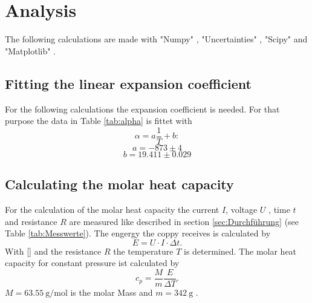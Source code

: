 \section{Analysis}
\label{sec:Auswertung}
The following calculations are made with  "Numpy" \cite{numpy}, 
"Uncertainties" \cite{uncertainties}, 
"Scipy" \cite{scipy} and  "Matplotlib" \cite{matplotlib}.

\subsection{Fitting the linear expansion coefficient}
For the following calculations the expansion coefficient is needed.
For that purpose the data in Table \ref{tab:alpha}
is fittet with
\begin{equation*}
    \alpha = a \frac{1}{T} + b:
\end{equation*}
\begin{equation*}
    a = -873 \pm 4
\end{equation*}
\begin{equation*}
    b= 19.411 \pm 0.029
\end{equation*}


\subsection{Calculating the molar heat capacity}
For the calculation of the molar heat capacity 
the current $I$, voltage $U$ , time $t$ and resistance $R$ are measured 
like described in section \ref{sec:Durchführung} (see Table \ref{tab:Messwerte}).
\newline \newline
\noindent The engergy the coppy receives is calculated by 
\begin{equation}
    E = U \cdot I \cdot \Delta t .
\end{equation}
\noindent With \eqref{} and the resistance $R$ the temperature $T$ is determined.
The molar heat capacity for constant pressure ist calculated by
\begin{equation}
    c_p = \frac{ M}{m} \frac{E}{\Delta T}.
\end{equation}
\noindent $M = \SI{63.55}{\g\per\mole}$ is the molar Mass and
$m= \SI{342}{\g}$ \cite{Molmasse_kupfer}\cite{V47}.

